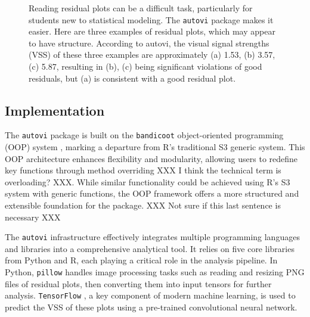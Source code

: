 \documentclass[
doublespace,
  times]{anzsauth}
\begin{document}
\begin{figure}


\caption{\label{fig-three-examples}Reading residual plots can be a
difficult task, particularly for students new to statistical modeling.
The \texttt{autovi} package makes it easier. Here are three examples of
residual plots, which may appear to have structure. According to autovi,
the visual signal strengths (VSS) of these three examples are
approximately (a) 1.53, (b) 3.57, (c) 5.87, resulting in (b), (c) being
significant violations of good residuals, but (a) is consistent with a
good residual plot.}

\end{figure}%

\subsection{Implementation}\label{sec-autovi-implementation}

The \texttt{autovi} package is built on the \texttt{bandicoot}
object-oriented programming (OOP) system \citep{bandicoot}, marking a
departure from R's traditional S3 generic system. This OOP architecture
enhances flexibility and modularity, allowing users to redefine key
functions through method overriding XXX I think the technical term is
overloading? XXX. While similar functionality could be achieved using
R's S3 system with generic functions, the OOP framework offers a more
structured and extensible foundation for the package. XXX Not sure if
this last sentence is necessary XXX

The \texttt{autovi} infrastructure effectively integrates multiple
programming languages and libraries into a comprehensive analytical
tool. It relies on five core libraries from Python and R, each playing a
critical role in the analysis pipeline. In Python, \texttt{pillow}
\citep{clark2015pillow} handles image processing tasks such as reading
and resizing PNG files of residual plots, then converting them into
input tensors for further analysis. \texttt{TensorFlow}
\citep{abadi2016tensorflow}, a key component of modern machine learning,
is used to predict the VSS of these plots using a pre-trained
convolutional neural network.
\end{document}
